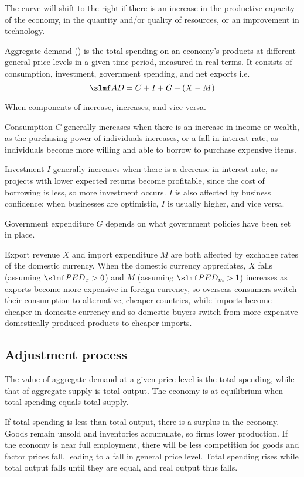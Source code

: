 \documentclass[Economics.tex]{subfiles}
\begin{document}
The \AS{} curve will shift to the right if there is an increase in the productive capacity of the economy, in the quantity and/or quality of resources, or an improvement in technology.

Aggregate demand (\AD{}) is the total spending on an economy's products at different general price levels in a given time period, measured in real terms. It consists of consumption, investment, government spending, and net exports i.e. \[\AD = C + I + G + (X-M)\]

When components of \AD{} increase, \AD{} increases, and vice versa.

Consumption \(C\) generally increases when there is an increase in income or wealth, as the purchasing power of individuals increases, or a fall in interest rate, as individuals become more willing and able to borrow to purchase expensive items.

Investment \(I\) generally increases when there is a decrease in interest rate, as projects with lower expected returns become profitable, since the cost of borrowing is less, so more investment occurs. \(I\) is also affected by business confidence: when businesses are optimistic, \(I\) is usually higher, and vice versa.

Government expenditure \(G\) depends on what government policies have been set in place.

Export revenue \(X\) and import expenditure \(M\) are both affected by exchange rates of the domestic currency. When the domestic currency appreciates, \(X\) falls (assuming \(\PEDx > 0\)) and \(M\) (assuming \(\PEDm > 1\)) increases as exports become more expensive in foreign currency, so overseas consumers switch their consumption to alternative, cheaper countries, while imports become cheaper in domestic currency and so domestic buyers switch from more expensive do\-mes\-tic\-ally-pro\-duced products to cheaper imports.
\subsection{Adjustment process}
The value of aggregate demand at a given price level is the total spending, while that of aggregate supply is total output. The economy is at equilibrium when total spending equals total supply.

If total spending is less than total output, there is a surplus in the economy. Goods remain unsold and inventories accumulate, so firms lower production. If the economy is near full employment, there will be less competition for goods and factor prices fall, leading to a fall in general price level. Total spending rises while total output falls until they are equal, and real output thus falls.
\end{document}
